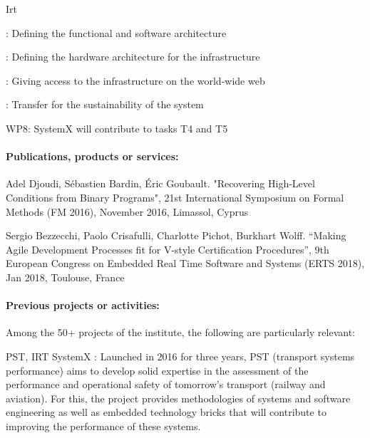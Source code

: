\begin{sitedescription}{Irt}
\begin{compactitem}
\item {} : Defining the functional and software architecture
\item {} : Defining the hardware architecture for the infrastructure
\item {} : Giving access to the infrastructure on the world-wide web
\item {} : Transfer for the sustainability of the system
\item WP8: SystemX will contribute to tasks T4 and T5
\end{compactitem}




\paragraph*{Publications, products or services:}

\begin{compactitem}
\item Adel Djoudi, Sébastien Bardin, Éric Goubault. "Recovering High-Level Conditions from Binary Programs", 21st International Symposium on Formal Methods (FM 2016), November 2016, Limassol, Cyprus
\item Sergio Bezzecchi, Paolo Crisafulli, Charlotte Pichot, Burkhart Wolff. “Making Agile Development Processes fit for V-style Certification Procedures”, 9th European Congress on Embedded Real Time Software and Systems (ERTS 2018), Jan 2018, Toulouse, France
\end{compactitem}





\paragraph*{Previous projects or activities:}

Among the 50+ projects of the institute, the following are particularly relevant:

\begin{compactitem}
\item PST, IRT SystemX : Launched in 2016 for three years, PST (transport systems performance) aims to develop solid expertise in the assessment of the performance and operational safety of tomorrow’s transport (railway and aviation). For this, the project provides methodologies of systems and software engineering as well as embedded technology bricks that will contribute to improving the performance of these systems.
\end{compactitem}







\end{sitedescription}
